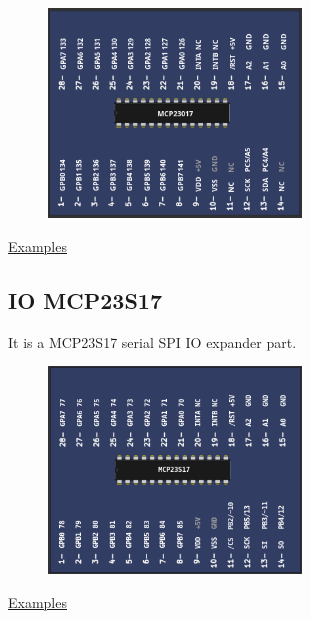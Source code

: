 \begin{figure}[H]
\center
\includegraphics[width=0.6\textwidth]{img/part_MCP23017.png} 
\end{figure} 

\href{https://lcgamboa.github.io/picsimlab_examples/parts_IO_MCP23017.html}{Examples}

\vspace{0.5cm}

\subsection{IO MCP23S17}

It is a MCP23S17 serial SPI IO expander part.

\begin{figure}[H]
\center
\includegraphics[width=0.6\textwidth]{img/part_MCP23S17.png} 
\end{figure} 

\href{https://lcgamboa.github.io/picsimlab_examples/parts_IO_MCP23S17.html}{Examples}

\vspace{0.5cm}


